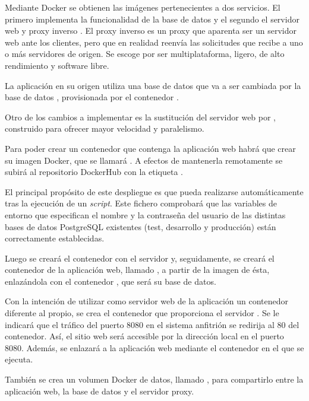 Mediante Docker se obtienen las imágenes pertenecientes a dos servicios. El primero implementa la funcionalidad de la base de datos  y el segundo el servidor web y proxy inverso . El proxy inverso es un proxy que aparenta ser un servidor web ante los clientes, pero que en realidad reenvía las solicitudes que recibe a uno o más servidores de origen. Se escoge  por ser multiplataforma, ligero, de alto rendimiento y software libre.

La aplicación en su origen utiliza una base de datos  que va a ser cambiada por la base de datos , provisionada por el contenedor . 

Otro de los cambios a implementar es la sustitución del servidor web  por , construido para ofrecer mayor velocidad y paralelismo.

Para poder crear un contenedor que contenga la aplicación web habrá que crear su imagen Docker, que se llamará . A efectos de mantenerla remotamente se subirá al repositorio DockerHub con la etiqueta .

El principal propósito de este despliegue es que pueda realizarse automáticamente tras la ejecución de un \textit{script}. Este fichero comprobará que las variables de entorno que especifican el nombre y la contraseña del usuario de las distintas bases de datos PostgreSQL existentes (test, desarrollo y producción) están correctamente establecidas.

Luego se creará el contenedor  con el servidor  y, seguidamente, se creará el contenedor de la aplicación web, llamado , a partir de la imagen de ésta, enlazándola con el contenedor , que será su base de datos.

Con la intención de utilizar como servidor web de la aplicación un contenedor diferente al propio, se crea el contenedor  que proporciona el servidor . Se le indicará que el tráfico del puerto 8080 en el sistema anfitrión se redirija al 80 del contenedor. Así, el sitio web será accesible por la dirección local en el puerto 8080. Además, se enlazará a la aplicación web mediante el contenedor en el que se ejecuta.

También se crea un volumen Docker de datos, llamado , para compartirlo entre la aplicación web, la base de datos y el servidor proxy.

